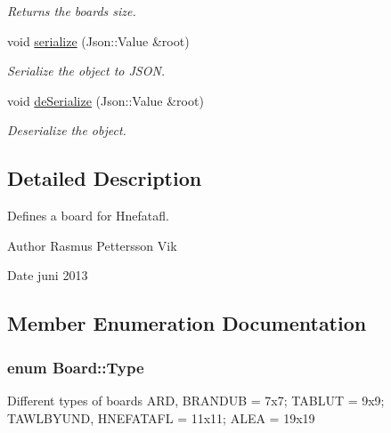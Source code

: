 \begin{DoxyCompactItemize}
\begin{DoxyCompactList}\small\item\em Returns the boards size. \end{DoxyCompactList}\item 
\hypertarget{class_board_ab0459595994fae0457f0cf58cd6096a1}{void \hyperlink{class_board_ab0459595994fae0457f0cf58cd6096a1}{serialize} (Json\-::\-Value \&root)}\label{class_board_ab0459595994fae0457f0cf58cd6096a1}

\begin{DoxyCompactList}\small\item\em Serialize the object to J\-S\-O\-N. \end{DoxyCompactList}\item 
\hypertarget{class_board_a40f5300d8b4d641d3123a6e9c3a49a45}{void \hyperlink{class_board_a40f5300d8b4d641d3123a6e9c3a49a45}{de\-Serialize} (Json\-::\-Value \&root)}\label{class_board_a40f5300d8b4d641d3123a6e9c3a49a45}

\begin{DoxyCompactList}\small\item\em Deserialize the object. \end{DoxyCompactList}\end{DoxyCompactItemize}


\subsection{Detailed Description}
Defines a board for Hnefatafl. 

\begin{DoxyAuthor}{Author}
Rasmus Pettersson Vik 
\end{DoxyAuthor}
\begin{DoxyDate}{Date}
juni 2013 
\end{DoxyDate}


\subsection{Member Enumeration Documentation}
\hypertarget{class_board_a7a90fdd0f301fc502684108416605644}{
\subsubsection[{Type}]{\setlength{\rightskip}{0pt plus 5cm}enum {\bf Board\-::\-Type}}}\label{class_board_a7a90fdd0f301fc502684108416605644}
Different types of boards A\-R\-D, B\-R\-A\-N\-D\-U\-B = 7x7; T\-A\-B\-L\-U\-T = 9x9; T\-A\-W\-L\-B\-Y\-U\-N\-D, H\-N\-E\-F\-A\-T\-A\-F\-L = 11x11; A\-L\-E\-A = 19x19 

